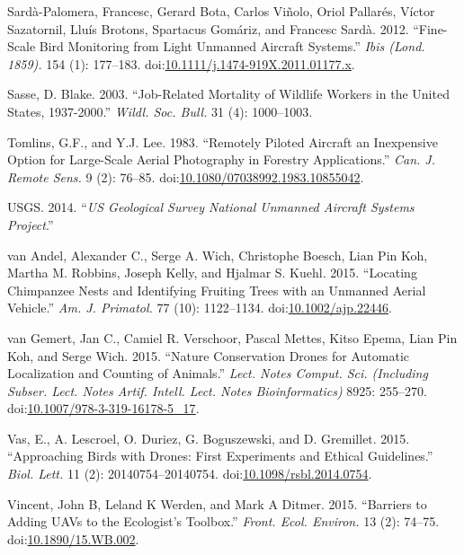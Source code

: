 \documentclass[]{interact}
\theoremstyle{plain}%
\theoremstyle{definition}
\theoremstyle{remark}
\begin{document}
\hypertarget{ref-sarda-palomera_fine-scale_2012}{}
Sardà-Palomera, Francesc, Gerard Bota, Carlos Viñolo, Oriol Pallarés,
Víctor Sazatornil, Lluís Brotons, Spartacus Gomáriz, and Francesc Sardà.
2012. ``Fine-Scale Bird Monitoring from Light Unmanned Aircraft
Systems.'' \emph{Ibis (Lond. 1859).} 154 (1): 177--183.
doi:\href{https://doi.org/10.1111/j.1474-919X.2011.01177.x}{10.1111/j.1474-919X.2011.01177.x}.

\hypertarget{ref-sasse_job-related_2003}{}
Sasse, D. Blake. 2003. ``Job-Related Mortality of Wildlife Workers in
the United States, 1937-2000.'' \emph{Wildl. Soc. Bull.} 31 (4):
1000--1003.

\hypertarget{ref-tomlins_remotely_1983}{}
Tomlins, G.F., and Y.J. Lee. 1983. ``Remotely Piloted Aircraft an
Inexpensive Option for Large-Scale Aerial Photography in Forestry
Applications.'' \emph{Can. J. Remote Sens.} 9 (2): 76--85.
doi:\href{https://doi.org/10.1080/07038992.1983.10855042}{10.1080/07038992.1983.10855042}.

\hypertarget{ref-USGS2014}{}
USGS. 2014. ``\emph{US Geological Survey National Unmanned Aircraft
Systems Project}.''

\hypertarget{ref-van_andel_locating_2015}{}
van Andel, Alexander C., Serge A. Wich, Christophe Boesch, Lian Pin Koh,
Martha M. Robbins, Joseph Kelly, and Hjalmar S. Kuehl. 2015. ``Locating
Chimpanzee Nests and Identifying Fruiting Trees with an Unmanned Aerial
Vehicle.'' \emph{Am. J. Primatol.} 77 (10): 1122--1134.
doi:\href{https://doi.org/10.1002/ajp.22446}{10.1002/ajp.22446}.

\hypertarget{ref-van_gemert_nature_2015}{}
van Gemert, Jan C., Camiel R. Verschoor, Pascal Mettes, Kitso Epema,
Lian Pin Koh, and Serge Wich. 2015. ``Nature Conservation Drones for
Automatic Localization and Counting of Animals.'' \emph{Lect. Notes
Comput. Sci. (Including Subser. Lect. Notes Artif. Intell. Lect. Notes
Bioinformatics)} 8925: 255--270.
doi:\href{https://doi.org/10.1007/978-3-319-16178-5_17}{10.1007/978-3-319-16178-5\_17}.

\hypertarget{ref-vas_approaching_2015}{}
Vas, E., A. Lescroel, O. Duriez, G. Boguszewski, and D. Gremillet. 2015.
``Approaching Birds with Drones: First Experiments and Ethical
Guidelines.'' \emph{Biol. Lett.} 11 (2): 20140754--20140754.
doi:\href{https://doi.org/10.1098/rsbl.2014.0754}{10.1098/rsbl.2014.0754}.

\hypertarget{ref-vincent_barriers_2015}{}
Vincent, John B, Leland K Werden, and Mark A Ditmer. 2015. ``Barriers to
Adding UAVs to the Ecologist's Toolbox.'' \emph{Front. Ecol. Environ.}
13 (2): 74--75.
doi:\href{https://doi.org/10.1890/15.WB.002}{10.1890/15.WB.002}.
\end{document}
